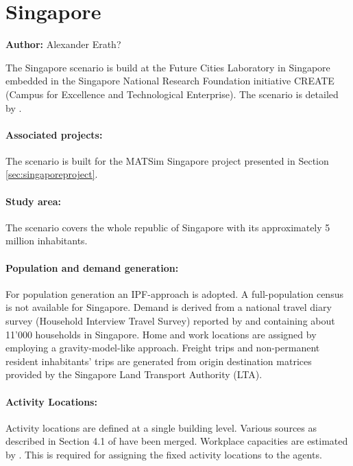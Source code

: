 \section{Singapore}
\label{ch:scenarios:singapore}
\hfill \textbf{Author:} Alexander Erath?

The Singapore scenario is build at the Future Cities Laboratory in Singapore embedded in the Singapore National Research Foundation initiative CREATE (Campus for Excellence and Technological Enterprise). The scenario is detailed by \citet[][]{ErathEtAl_TechRep_FCL_forth, Erath_unpub_UniSeoul_2011}.

\paragraph{Associated projects:} 
The scenario is built for the MATSim Singapore project presented in Section \ref{sec:singaporeproject}.

\paragraph{Study area:} 
The scenario covers the whole republic of Singapore with its approximately 5 million inhabitants.

\paragraph{Population and demand generation:} 
For population generation an IPF-approach is adopted. A full-population census is not available for Singapore. Demand is derived from a national travel diary survey (Household Interview Travel Survey) reported by \citet[][]{Choi_JOUR_2010} and containing about 11'000 households in Singapore. Home and work locations are assigned by employing a gravity-model-like approach. Freight trips and non-permanent resident inhabitants' trips are generated from origin destination matrices provided by the Singapore Land Transport Authority (LTA).

\paragraph{Activity Locations:} 
Activity locations are defined at a single building level. Various sources as described in Section 4.1 of \citet[][]{ErathEtAl_TechRep_FCL_forth} have been merged. Workplace capacities are estimated by \citet[][]{OrdonezErath_TRR_2013}. This is required for assigning the fixed activity locations to the agents.

